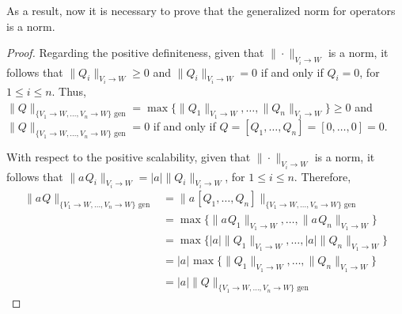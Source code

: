 As a result, now it is necessary to prove that the  generalized norm for operators is a norm.
\begin{proof}
  Regarding the positive definiteness,  given that $\|\cdot \|_{V_i \rightarrow W}$ is a norm, it follows that $\|Q_i\|_{V_i \rightarrow W} \geq 0$ and $\|Q_i\|_{V_i \rightarrow W} = 0$ if and only if $Q_i = 0$, for $1 \leq i \leq n $. Thus, $\|Q\|_{\{V_1\rightarrow W, \ldots, V_n\rightarrow W\} \text{ gen}} = \max \{\|Q_1\|_{V_1 \rightarrow W}, \ldots, \|Q_n\|_{V_1 \rightarrow W}  \} \geq 0$ and $\|Q\|_{\{V_1\rightarrow W, \ldots, V_n\rightarrow W\} \text{ gen}} = 0$ if and only if $Q = [Q_1, \ldots, Q_n] = [0, \ldots, 0] = 0$.

  With respect to the positive scalability, given that $\|\cdot \|_{V_i \rightarrow W}$ is a norm, it follows that $\|a \hspace{1pt} Q_i\|_{V_i \rightarrow W} = |a| \|Q_i\|_{V_i \rightarrow W}$, for $1 \leq i \leq n$. Therefore,
  \begin{align*}
    \|a \hspace{1pt} Q\|_{\{V_1\rightarrow W, \ldots, V_n\rightarrow W\} \text{ gen}} & = \|a \hspace{1pt} [Q_1, \ldots, Q_n]\|_{\{V_1\rightarrow W, \ldots, V_n\rightarrow W\} \text{ gen}}\\
     &=\max \{\|a \hspace{1pt} Q_1\|_{V_1 \rightarrow W}, \ldots, \|a \hspace{1pt} Q_n\|_{V_1 \rightarrow W}  \} \\
    & = \max \{|a| \|Q_1\|_{V_1 \rightarrow W}, \ldots, |a| \|Q_n\|_{V_1 \rightarrow W}  \} \\
    & = |a| \hspace{1pt} \max \{\|Q_1\|_{V_1 \rightarrow W}, \ldots, \|Q_n\|_{V_1 \rightarrow W}  \} \\
    & = |a| \|Q\|_{\{V_1\rightarrow W, \ldots, V_n\rightarrow W\} \text{ gen}}
  \end{align*}


\end{proof}
